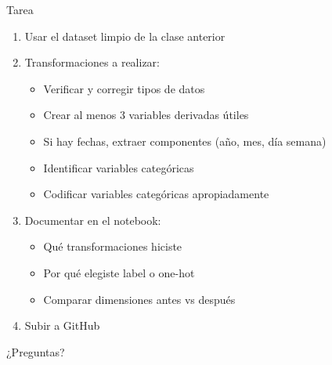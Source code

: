 \documentclass[aspectratio=169]{beamer}
\begin{document}
\begin{frame}{Tarea}
\begin{enumerate}
    \item Usar el dataset limpio de la clase anterior
    \item Transformaciones a realizar:
    \begin{itemize}
        \item Verificar y corregir tipos de datos
        \item Crear al menos 3 variables derivadas útiles
        \item Si hay fechas, extraer componentes (año, mes, día semana)
        \item Identificar variables categóricas
        \item Codificar variables categóricas apropiadamente
    \end{itemize}
    \item Documentar en el notebook:
    \begin{itemize}
        \item Qué transformaciones hiciste
        \item Por qué elegiste label o one-hot
        \item Comparar dimensiones antes vs después
    \end{itemize}
    \item Subir a GitHub
\end{enumerate}
\end{frame}

\begin{frame}[standout]
\Huge ¿Preguntas?
\end{frame}
\end{document}
